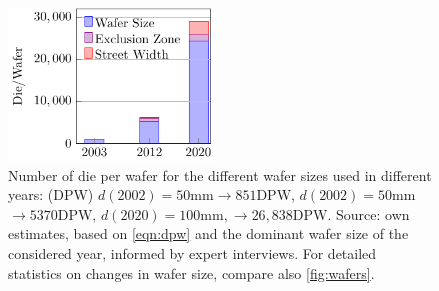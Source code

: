 \documentclass[10pt]{article}
\begin{document}
\begin{figure}[h!]
    \centering
    \includegraphics[width=5.5cm]{./figures/die-per-wafer.pdf}
    \caption{Number of die per wafer for the different wafer sizes used in different years: (DPW) $d(2002)=50$mm$\rightarrow851$DPW, $d(2002)=50$mm$\rightarrow5370$DPW, $d(2020)=100$mm$, \rightarrow26,838$DPW. Source: own estimates, based on \cref{eqn:dpw} and the dominant wafer size of the considered year, informed by expert interviews. For detailed statistics on changes in wafer size, compare also \cref{fig:wafers}.}
    \label{fig:dpw}
\end{figure}
\end{document}
